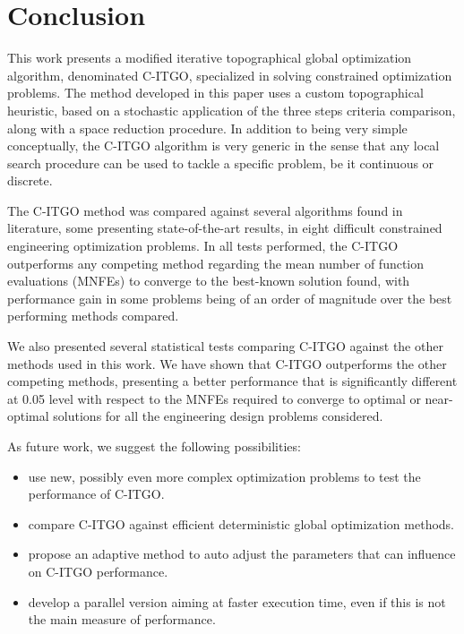 \section{Conclusion} \label{sec:Conclusion}

This work presents a modified iterative topographical global optimization algorithm, denominated C-ITGO, specialized in solving constrained optimization problems. The method developed in this paper uses a custom topographical heuristic, based on a stochastic application of the three steps criteria comparison, along with a space reduction procedure. In addition to being very simple conceptually, the C-ITGO algorithm is very generic in the sense that any local search procedure can be used to tackle a specific problem, be it continuous or discrete.

The C-ITGO method was compared against several algorithms found in literature, some presenting state-of-the-art results, in eight difficult constrained engineering optimization problems. In all tests performed, the C-ITGO outperforms any competing method regarding the mean number of function evaluations (MNFEs) to converge to the best-known solution found, with performance gain in some problems being of an order of magnitude over the best performing methods compared.

We also presented several statistical tests comparing C-ITGO against the other methods used in this work. We have shown that C-ITGO outperforms the other competing methods, presenting a better performance that is significantly different at 0.05 level with respect to the MNFEs required to converge to optimal or near-optimal solutions for all the engineering design problems considered.

As future work, we suggest the following possibilities:


\begin{itemize}

    \item use new, possibly even more complex optimization problems to test the performance of C-ITGO.

    \item compare C-ITGO against efficient deterministic global optimization methods.

    \item propose an adaptive method to auto adjust the parameters that can influence on C-ITGO performance.

    \item develop a parallel version aiming at faster execution time, even if this is not the main measure of performance.


\end{itemize}